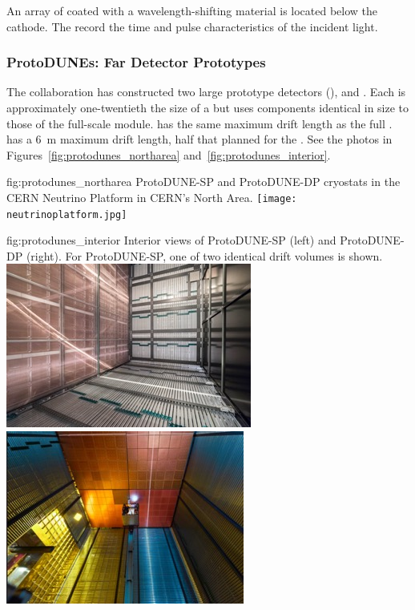 An array of  coated with a wavelength-shifting material is located below the cathode. The  record  the time and pulse characteristics of the incident light.



\FloatBarrier

\subsubsection{ProtoDUNEs: Far Detector Prototypes}

The  collaboration has constructed 
two large prototype detectors (),  and .  %
 Each is approximately one-twentieth the size of a   but uses components identical in size to those of the full-scale module.  has the same \spmaxdrift maximum drift length as the full .  has a \SI{6}{m} maximum drift length, half that planned for the . See the photos in Figures~\ref{fig:protodunes_northarea} and~\ref{fig:protodunes_interior}.

\begin{dunefigure}
{fig:protodunes_northarea}
{ProtoDUNE-SP and ProtoDUNE-DP cryostats in the CERN Neutrino Platform in CERN's North Area.}
\texttt{[image: neutrinoplatform.jpg]}
\end{dunefigure}

\begin{dunefigure}
{fig:protodunes_interior}
{Interior views of ProtoDUNE-SP (left) and ProtoDUNE-DP (right). For ProtoDUNE-SP, one of two identical drift volumes is shown.}
\includegraphics[width=0.46\linewidth]{graphics/ProtoDUNE-sp-interior.jpg}\hspace{0.05\linewidth}
\includegraphics[width=0.44\linewidth]{graphics/protodune-dp-interior.jpg}
\end{dunefigure}

